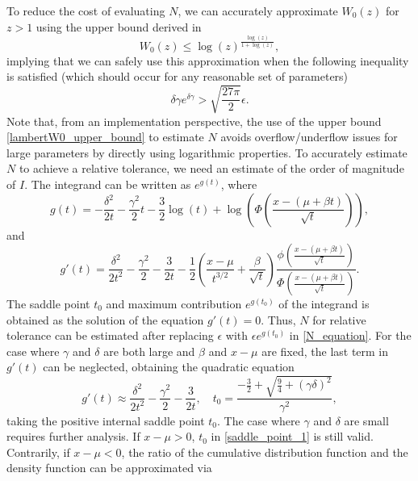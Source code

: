 \documentclass[10pt,a4paper,oneside]{article}
\numberwithin{equation}{section}
\begin{document}
To reduce the cost of evaluating $N$, we can accurately approximate $W_0(z)$ for $z > 1$ using the upper bound derived in \cite{Hoorfar2008}
\begin{equation}\label{lambertW0_upper_bound}
W_0(z) \le \log(z)^{\tfrac{\log(z)}{1 + \log(z)}},
\end{equation}
implying that we can safely use this approximation when the following inequality is satisfied (which should occur for any reasonable set of parameters)
\begin{equation}
\delta \gamma e^{\delta\gamma} > \sqrt{\frac{27 \pi}{2}} \epsilon.
\end{equation}
Note that, from an implementation perspective, the use of the upper bound  \eqref{lambertW0_upper_bound} to estimate $N$ avoids overflow/underflow issues for large parameters by directly using logarithmic properties. 
To accurately estimate $N$ to achieve a relative tolerance, we need an estimate of the order of magnitude of $I$. The integrand can be written as $e^{g(t)}$, where
\begin{equation}
g(t) = -\frac{\delta^2}{2t} - \frac{\gamma^2}{2}t - \frac{3}{2}\log(t) + \log\left(\Phi\left(\frac{x - (\mu +\beta t)}{\sqrt{t}}\right)\right),
\end{equation}
and
\begin{equation}\label{saddle_point_equation}
g'(t) = \frac{\delta^2}{2t^2} -\frac{\gamma^2}{2} -\frac{3}{2t} -\frac{1}{2}\left(\frac{x-\mu}{t^{3/2}} + \frac{\beta}{\sqrt{t}} \right)\frac{\phi\left(\frac{x - (\mu +\beta t)}{\sqrt{t}}\right)}{\Phi\left(\frac{x - (\mu +\beta t)}{\sqrt{t}}\right)}.
\end{equation}
The saddle point $t_0$ and maximum contribution $e^{g(t_0)}$ of the integrand is obtained as the solution of the equation $g'(t) = 0$. Thus, $N$ for relative tolerance can be estimated after replacing $\epsilon$ with $\epsilon e^{g(t_0)}$ in \eqref{N_equation}. For the case where $\gamma$ and $\delta$ are both large and $\beta$ and $x-\mu$ are fixed, the last term in $g'(t)$ can be neglected, obtaining the quadratic equation
\begin{equation}\label{saddle_point_1}
g'(t) \approx \frac{\delta^2}{2t^2} -\frac{\gamma^2}{2} -\frac{3}{2t}, \quad t_0 = \frac{-\frac{3}{2} + \sqrt{\frac{9}{4} + (\gamma \delta)^2}}{\gamma^2},
\end{equation}
taking the positive internal saddle point $t_0$. The case where $\gamma$ and $\delta$ are small requires further analysis. If $x-\mu > 0$, $t_0$ in \eqref{saddle_point_1} is still valid. Contrarily, if $x -\mu < 0$, the ratio of the cumulative distribution function and the density function can be approximated via
\end{document}
